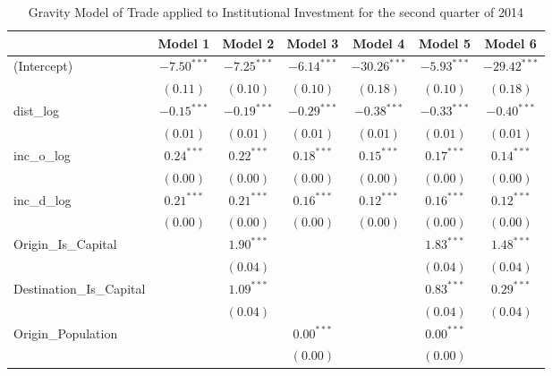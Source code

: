 \begin{table}
	\small
	\begin{center}
		\caption[Gravity Model of trade for Q2 2014]{Gravity Model of Trade applied to Institutional Investment for the second quarter of 2014}
		
		\begin{tabular}{l c c c c c c }
			\hline
			& Model 1 & Model 2 & Model 3 & Model 4 & Model 5 & Model 6 \\
			\hline
			(Intercept)                  & $-7.50^{***}$ & $-7.25^{***}$ & $-6.14^{***}$ & $-30.26^{***}$ & $-5.93^{***}$ & $-29.42^{***}$ \\
			& $(0.11)$      & $(0.10)$      & $(0.10)$      & $(0.18)$       & $(0.10)$      & $(0.18)$       \\
			dist\_log                    & $-0.15^{***}$ & $-0.19^{***}$ & $-0.29^{***}$ & $-0.38^{***}$  & $-0.33^{***}$ & $-0.40^{***}$  \\
			& $(0.01)$      & $(0.01)$      & $(0.01)$      & $(0.01)$       & $(0.01)$      & $(0.01)$       \\
			inc\_o\_log                  & $0.24^{***}$  & $0.22^{***}$  & $0.18^{***}$  & $0.15^{***}$   & $0.17^{***}$  & $0.14^{***}$   \\
			& $(0.00)$      & $(0.00)$      & $(0.00)$      & $(0.00)$       & $(0.00)$      & $(0.00)$       \\
			inc\_d\_log                  & $0.21^{***}$  & $0.21^{***}$  & $0.16^{***}$  & $0.12^{***}$   & $0.16^{***}$  & $0.12^{***}$   \\
			& $(0.00)$      & $(0.00)$      & $(0.00)$      & $(0.00)$       & $(0.00)$      & $(0.00)$       \\
			Origin\_Is\_Capital          &               & $1.90^{***}$  &               &                & $1.83^{***}$  & $1.48^{***}$   \\
			&               & $(0.04)$      &               &                & $(0.04)$      & $(0.04)$       \\
			Destination\_Is\_Capital     &               & $1.09^{***}$  &               &                & $0.83^{***}$  & $0.29^{***}$   \\
			&               & $(0.04)$      &               &                & $(0.04)$      & $(0.04)$       \\
			Origin\_Population           &               &               & $0.00^{***}$  &                & $0.00^{***}$  &                \\
			&               &               & $(0.00)$      &                & $(0.00)$      &                \\

\end{tabular}
\end{center}
\end{table}
